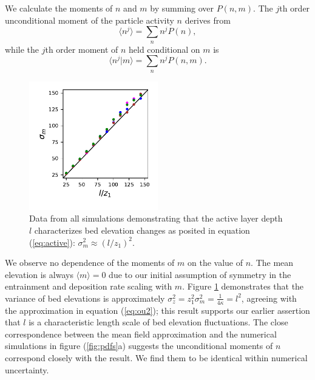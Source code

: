 We calculate the moments of $n$ and $m$ by summing over $P(n,m)$. 
The $j$th order unconditional moment of the particle activity $n$ derives from
\begin{equation} \langle n^j \rangle = \sum_{n}n^jP(n),\end{equation}
while the $j$th order moment of $n$ held conditional on $m$ is
\begin{equation} \langle n^j|m \rangle = \sum_{n}n^j P(n,m) .\end{equation}
\begin{figure}
	\centering
	\includegraphics[width=0.5\textwidth,keepaspectratio]{./figures/ch3/variance.pdf}
	\caption{Data from all simulations demonstrating that the active layer depth $l$ characterizes bed elevation changes as posited in equation (\ref{eq:active}): $\sigma_m^2 \approx (l/z_1)^2$. }
	\label{fig:var}
\end{figure}
We observe no dependence of the moments of $m$ on the value of $n$. 
The mean elevation is always $\langle m \rangle = 0 $ due to our initial assumption of symmetry in the entrainment and deposition rate scaling with $m$. 
Figure \ref{fig:var} demonstrates that the variance of bed elevations is approximately $\sigma_z^2 = z_1^2 \sigma_m^2 = \frac{1}{4\kappa}=l^2$, agreeing with the approximation in equation (\ref{eq:ou2}); this result supports our earlier assertion that $l$ is a characteristic length scale of bed elevation fluctuations.
The close correspondence between the mean field approximation and the numerical simulations in figure (\ref{fig:pdfs}a) suggests the unconditional moments of $n$ correspond closely with the \citet{Ancey2008} result. We find them to be identical within numerical uncertainty.


